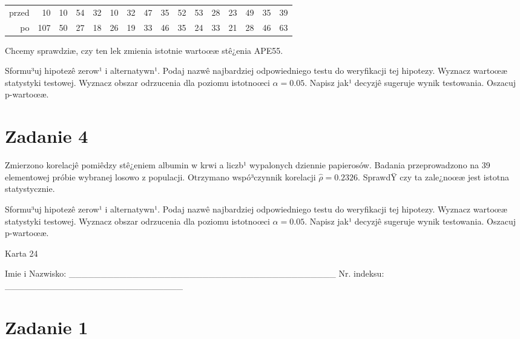 \documentclass[a4paper,12pt]{article}
\begin{document}
  \vspace{0.5cm} 
  \noindent\begin{center} 
\begin{tabular}{rrrrrrrrrrrrrrrr}
  \hline
  \hline
przed & 10 & 10 & 54 & 32 & 10 & 32 & 47 & 35 & 52 & 53 & 28 & 23 & 49 & 35 & 39 \\
  po & 107 & 50 & 27 & 18 & 26 & 19 & 33 & 46 & 35 & 24 & 33 & 21 & 28 & 46 & 63 \\
   \hline
\end{tabular}
 
  \end{center} 
  \vspace{0.5cm}
  
  Chcemy sprawdziæ, czy ten lek zmienia istotnie wartoœæ stê¿enia APE55.
  
  Sformu³uj hipotezê zerow¹ i alternatywn¹. 
  Podaj nazwê najbardziej odpowiedniego testu do weryfikacji tej hipotezy. 
  Wyznacz wartoœæ statystyki testowej. 
  Wyznacz obszar odrzucenia dla poziomu istotnoœci $\alpha=0.05$. 
  Napisz jak¹ decyzjê sugeruje wynik testowania. Oszacuj p-wartoœæ. \vspace{1cm} 

  \section*{Zadanie 4}
     
     Zmierzono korelacjê pomiêdzy stê¿eniem albumin w krwi a liczb¹ wypalonych dziennie papierosów. 
     Badania przeprowadzono na 39 elementowej próbie wybranej losowo z populacji. 
     Otrzymano wspó³czynnik korelacji $\hat\rho = 0.2326 $. 
     SprawdŸ czy ta zale¿noœæ jest istotna statystycznie. 
     
     Sformu³uj hipotezê zerow¹ i alternatywn¹. 
     Podaj nazwê najbardziej odpowiedniego testu do weryfikacji tej hipotezy. 
     Wyznacz wartoœæ statystyki testowej. 
     Wyznacz obszar odrzucenia dla poziomu istotnoœci $\alpha=0.05$. 
     Napisz jak¹ decyzjê sugeruje wynik testowania. 
     Oszacuj p-wartoœæ. \vspace{1cm} 

  \clearpage  Karta  24  

 Imie i Nazwisko: \_\_\_\_\_\_\_\_\_\_\_\_\_\_\_\_\_\_\_\_\_\_\_\_\_\_\_\_\_\_\_\_\_\_\_\_\_\_\_\_\_\_ Nr. indeksu: \_\_\_\_\_\_\_\_\_\_\_\_\_\_\_\_\_\_\_\_\_\_\_\_\_\_\_\_ 
 \section*{Zadanie 1}
     
\end{document}
